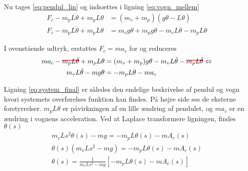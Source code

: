 Nu tages \ref{eq:pendul_lin} og indsættes i ligning \ref{eq:vogn_mellem}
\begin{align}
F_c - m_p L\ddot{\theta} + m_p L\theta &= (m_v + m_p)(g \theta -L \ddot{\theta}) \nonumber \\
F_c  - m_p L\ddot{\theta} + m_p L\theta &= m_v g \theta +  m_p g \theta - m_v L \ddot{\theta} - m_p L \ddot{\theta}
\end{align}

I ovenstående udtryk, erstattes $F_c = ma_c$ for og reduceres
\begin{align}
m a_c - \hcancel[red]{ m_p L\ddot{\theta}} + m_p L\theta &= (m_v + m_p) g \theta - m_v L \ddot{\theta} - \hcancel[red]{ m_p L\ddot{\theta}} \Leftrightarrow \nonumber \\
m_v L \ddot{\theta} - m g \theta &= - m_p L\theta -m a_c \label{eq:system_final}
\end{align} 

Ligning \ref{eq:system_final} er således den endelige beskrivelse af pendul og vogn hvori systemets overførelses funktion kan findes. På højre side ses de eksterne forstyrrelser. $m_pL\theta $ er påvirkningen af en lille ændring af pendulet, og $m a_c$ er en ændring i vognens acceleration. Ved at Laplace transformere ligningen, findes $\theta(s)$
\begin{align}
m_vLs^2\theta(s) - mg = -m_pL\theta(s) -mA_c(s) \\
\theta(s)\left(m_vLs^2 - mg \right) = -m_pL\theta(s) -mA_c(s) \\
\theta(s) = \frac{1}{m_vLs^2 - mg }\left[-m_pL\theta(s) -mA_c(s)\right]
\end{align} 
